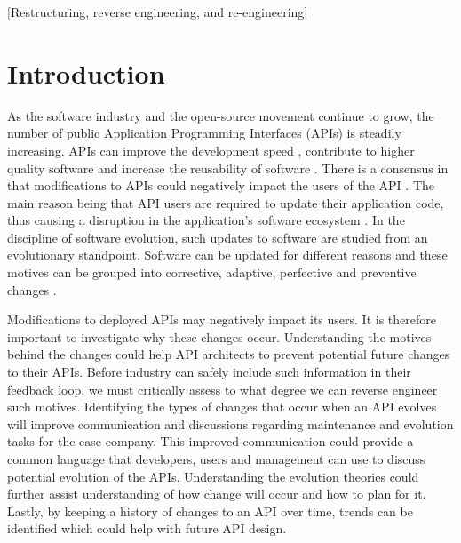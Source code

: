 \documentclass{sig-alternate}
\begin{document}
[Restructuring, reverse engineering, and re-engineering]

\newpage
 
\section{Introduction} \label{introduction}
As the software industry and the open-source movement continue to grow, the number of public Application Programming Interfaces (APIs) is steadily increasing. APIs can improve the development speed \cite{stylos2006comparing}, contribute to higher quality software \cite{stylos2006comparing} and increase the reusability of software \cite{afonso2012evaluating}. There is a consensus in that modifications to APIs could negatively impact the users of the API \cite{google_talk, henning2007api, mcdonnell2013empirical, robbes2012developers}. The main reason being that API users are required to update their application code, thus causing a disruption in the application's software ecosystem \cite{messerschmitt2005software}. 
In the discipline of software evolution, such updates to software are studied from an evolutionary standpoint. Software can be updated for different reasons and these motives can be grouped into corrective, adaptive, perfective and preventive changes \cite{lientz1980software}. 

Modifications to deployed APIs may negatively impact its users. It is therefore important to investigate why these changes occur. Understanding the motives behind the changes could help API architects to prevent potential future changes to their APIs. Before industry can safely include such information in their feedback loop, we must critically assess to what degree we can reverse engineer such motives. 
Identifying the types of changes that occur when an API evolves will improve communication and discussions regarding maintenance and evolution tasks for the case company. This improved communication could provide a common language that developers, users and management can use to discuss potential evolution of the APIs. Understanding the evolution theories could further assist understanding of how change will occur and how to plan for it. Lastly, by keeping a history of changes to an API over time, trends can be identified which could help with future API design.
\end{document}

